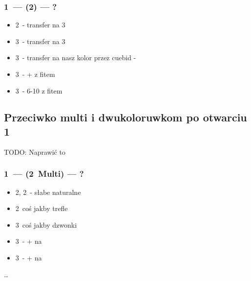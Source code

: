 \documentclass[12pt, a4paper]{article}
\begin{document}
\subsubsection{1\spades\ --- (2\spades) --- ?}
\begin{itemize}
    \item 2\nt\ - transfer na 3\clubs
    \item 3\clubs\ - transfer na 3\diams
    \item 3\diams\ - transfer na nasz kolor przez cuebid - \mixed
    \item 3\hearts\ - \inv+ z fitem \spades
    \item 3\spades\ - 6-10 z fitem \spades
\end{itemize}

\subsection{Przeciwko multi i dwukoloruwkom po otwarciu 1\clubs}
TODO: Naprawić to
\subsubsection{1\clubs\ --- (2\diams\ Multi) --- ?}
\begin{itemize}
    \item 2\hearts, 2\spades\ - słabe naturalne
    \item 2\nt\ coś jakby trefle
    \item 3\clubs\ coś jakby dzwonki
    \item 3\diams\ - \inv+ na \hearts
    \item 3\hearts\ - \inv+ na \spades
\end{itemize}
\dots
\end{document}
